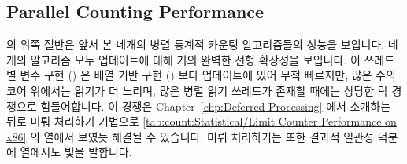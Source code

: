\subsection{Parallel Counting Performance}
\label{sec:count:Parallel Counting Performance}

의 위쪽 절반은 앞서 본 네개의 병렬 통계적 카운팅 알고리즘들의 성능을 보입니다.
네개의 알고리즘 모두 업데이트에 대해 거의 완벽한 선형 확장성을 보입니다.
이 쓰레드별 변수 구현 () 은 배열 기반 구현
() 보다 업데이트에 있어 무척 빠르지만, 많은 수의 코어
위에서는 읽기가 더 느리며, 많은 병렬 읽기 쓰레드가 존재할 때에는 상당한 락
경쟁으로 힘들어합니다.
이 경쟁은 Chapter~\ref{chp:Deferred Processing} 에서 소개하는 뒤로 미뤄
처리하기 기법으로
\cref{tab:count:Statistical/Limit Counter Performance on x86}
의  열에서 보였듯 해결될 수 있습니다.
미뤄 처리하기는 또한 결과적 일관성 덕분에  열에서도
빛을 발합니다.

